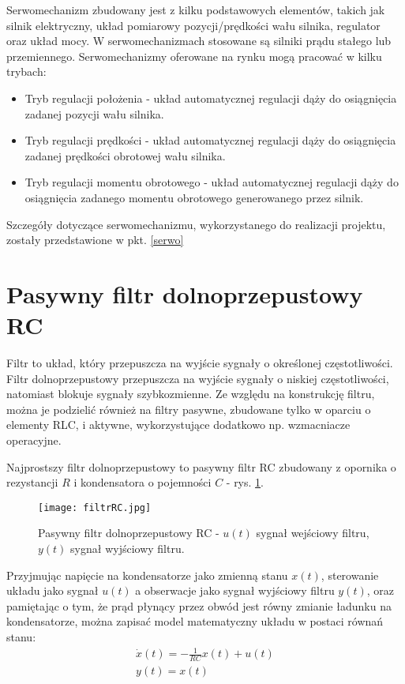 Serwomechanizm zbudowany jest z kilku podstawowych elementów, takich jak silnik elektryczny, układ pomiarowy pozycji/prędkości wału silnika, regulator oraz układ mocy. W serwomechanizmach stosowane są silniki prądu stałego lub przemiennego. Serwomechanizmy oferowane na rynku mogą pracować w kilku trybach:
\begin{itemize}
\item
     Tryb regulacji położenia - układ automatycznej regulacji dąży do osiągnięcia zadanej pozycji wału silnika.
\item
    Tryb regulacji prędkości - układ automatycznej regulacji dąży do osiągnięcia zadanej prędkości obrotowej wału silnika.
\item
    Tryb regulacji momentu obrotowego - układ automatycznej regulacji dąży do osiągnięcia zadanego momentu obrotowego generowanego przez silnik.
\end{itemize}

Szczegóły dotyczące serwomechanizmu, wykorzystanego do realizacji projektu, zostały przedstawione w pkt. \ref{serwo}  
\section{Pasywny filtr dolnoprzepustowy RC}

Filtr to układ, który przepuszcza na wyjście sygnały o określonej częstotliwości. Filtr dolnoprzepustowy przepuszcza na wyjście sygnały o niskiej częstotliwości, natomiast blokuje sygnały szybkozmienne. Ze względu na konstrukcję filtru, można je podzielić również na filtry pasywne, zbudowane tylko w oparciu o elementy RLC, i aktywne, wykorzystujące dodatkowo np. wzmacniacze operacyjne. 

Najprostszy filtr dolnoprzepustowy to pasywny filtr RC zbudowany z opornika o rezystancji $R$ i kondensatora o pojemności $C$ - rys. \ref{fig:filtrRC1}. 
\begin{figure}[h]
    \centering
    \texttt{[image: filtrRC.jpg]}
    \caption{Pasywny filtr dolnoprzepustowy RC - $u(t)$ sygnał wejściowy filtru, $y(t)$ sygnał wyjściowy filtru.}
    \label{fig:filtrRC1}
\end{figure}


Przyjmując napięcie na kondensatorze jako zmienną stanu $x(t)$, sterowanie układu jako sygnał $u(t)$ a obserwacje jako sygnał wyjściowy filtru $y(t)$, oraz pamiętając o tym, że prąd płynący przez obwód jest równy zmianie ładunku na kondensatorze, można zapisać model matematyczny układu w postaci równań stanu:
\begin{equation}
\begin{gathered}
    \dot{x}(t) = -\frac{1}{RC}x(t) + u(t) \\
    y(t) = x(t)
     \label{eq:stanuRC}
\end{gathered}
\end{equation}

